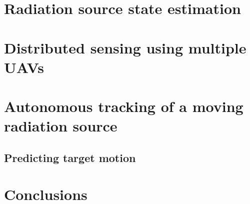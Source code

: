 \documentclass[a4paper,12pt,titlepage, twoside]{article}
\begin{document}


\section{Radiation source state estimation}



\section{Distributed sensing using multiple UAVs}



\section{Autonomous tracking of a moving radiation source}

\subsection{Predicting target motion}



\section{Conclusions}




\clearpage
{}
\cleardoublepage

\clearpage




\end{document}
